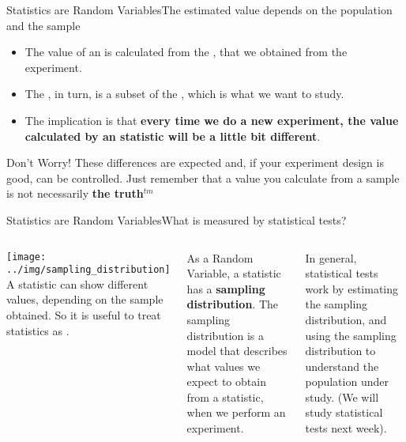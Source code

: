 \begin{frame}{Statistics are Random Variables}{The estimated value depends on the population and the sample}

  \begin{itemize}
    \item The value of an  is calculated from the , that we obtained from the experiment.
    \item The , in turn, is a subset of the , which is what we want to study.\bigskip

    \item The implication is that {\bf every time we do a new experiment, the value calculated by an statistic will be a little bit different}.
  \end{itemize}\vfill

  \begin{exampleblock}{Don't Worry!}
    These differences are expected and, if your experiment design is good, can be controlled. Just remember that a value you calculate from a sample is not necessarily {\bf the truth}$^{tm}$
  \end{exampleblock}


\end{frame}

\begin{frame}{Statistics are Random Variables}{What is measured by statistical tests?}
  \begin{columns}[T]
      \texttt{[image: ../img/sampling\_distribution]}
    A statistic can show different values, depending on the sample obtained.
    So it is useful to treat statistics as .\bigskip

    As a Random Variable, a statistic has a {\bf sampling distribution}.
    The sampling distribution is a model that describes what values we expect
    to obtain from a statistic, when we perform an experiment.\bigskip

    In general, statistical tests work by estimating the sampling distribution,
    and using the sampling distribution to understand the population under study.
    (We will study statistical tests next week).
  \end{columns}

\end{frame}




